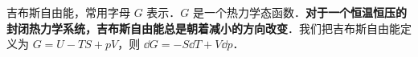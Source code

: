 

吉布斯自由能，常用字母 $G$ 表示．$G$ 是一个热力学态函数．\textbf{对于一个恒温恒压的封闭热力学系统，吉布斯自由能总是朝着减小的方向改变}．我们把吉布斯自由能定义为 $G=U-TS+pV$，则 $\dd G=-S\dd T+V\dd p$．